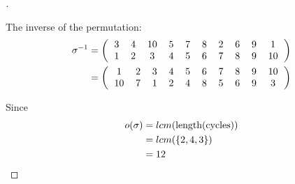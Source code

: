 \documentclass[paper=usletter, fontsize=12pt]{article}
\begin{document}
\begin{itemize}
\begin{itemize}
\begin{proof}[\unskip\nopunct]
\begin{figure}[!htbp]
                \end{figure}

                The inverse of the permutation:
                \begingroup
                \addtolength{\jot}{1em}
                \begin{align*}
                    \sigma^{-1} &= \left(
                        \begin{tabular}{cccccccccc}
                            3 & 4 & 10 & 5 & 7 & 8 & 2 & 6 & 9 & 1 \\
                            1 & 2 & 3 & 4 & 5 & 6 & 7 & 8 & 9 & 10
                        \end{tabular}
                    \right) \\
                    & = \left(
                        \begin{tabular}{cccccccccc}
                            1 & 2 & 3 & 4 & 5 & 6 & 7 & 8 & 9 & 10 \\
                            10 & 7 & 1 & 2 & 4 & 8 & 5 & 6 & 9 & 3
                        \end{tabular}
                    \right)
                \end{align*}
                \endgroup

                Since
                \begin{align*}
                    o(\sigma) & = lcm(\text{length(cycles)})\\
                    & = lcm(\{2,4,3\})\\
                    & = 12 \qedhere
                \end{align*}

            \end{proof}
            \vspace{0.2in}


\end{itemize}
\end{itemize}
\end{document}
